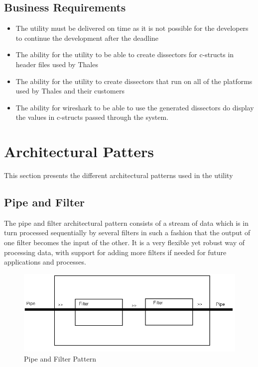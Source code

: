\subsection{Business Requirements}

\begin{itemize}
\item The utility must be delivered on time as it is not possible for the developers to continue the development after the deadline
\item The ability for the utility to be able to create dissectors for c-structs in header files used by Thales
\item The ability for the utility to create dissectors that run on all of the platforms used by Thales and their customers
\item The ability for wireshark to be able to use the generated dissectors do display the values in c-structs passed through the system.
\end{itemize}


\section{Architectural Patters}
This section presents the different architectural patterns used in the utility
\subsection{Pipe and Filter}
The pipe and filter architectural pattern consists of a stream of data which is in turn processed sequentially by several filters in such a fashion that the output of one filter becomes the input of the other. It is a very flexible yet robust way of processing data, with support for adding more filters if needed for future applications and processes.
\begin{figure}[ht]
\includegraphics[width = \textwidth]{./planning/img/PipeAndFilter}
\caption{Pipe and Filter Pattern} 
\label{fig:pipefilter}
\end{figure}

